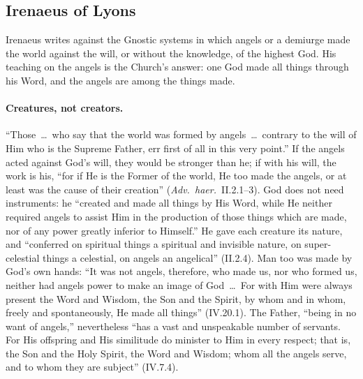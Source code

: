 \sectionguard
\subsection{Irenaeus of Lyons}

Irenaeus writes against the Gnostic systems in which angels or a
demiurge made the world against the will, or without the knowledge, of the
highest God. His teaching on the angels is the Church's answer: one God
made all things through his Word, and the angels are among the things made.

\paragraph{Creatures, not creators.} ``Those~\dots\ who say that the world
was formed by angels~\dots\ contrary to the will of Him who is the
Supreme Father, err first of all in this very point.'' If the angels acted
against God's will, they would be stronger than he; if with his will, the
work is his, ``for if He is the Former of the world, He too made the
angels, or at least was the cause of their creation'' (\emph{Adv.\ haer.}\
II.2.1--3). God does not need instruments: he ``created and made all things
by His Word, while He neither required angels to assist Him in the
production of those things which are made, nor of any power greatly
inferior to Himself.'' He gave each creature its nature, and ``conferred on
spiritual things a spiritual and invisible nature, on super-celestial
things a celestial, on angels an angelical'' (II.2.4). Man too was made by
God's own hands: ``It was not angels, therefore, who made us, nor who formed
us, neither had angels power to make an image of God~\dots\ For with Him
were always present the Word and Wisdom, the Son and the Spirit, by whom
and in whom, freely and spontaneously, He made all things'' (IV.20.1). The
Father, ``being in no want of angels,'' nevertheless ``has a vast and
unspeakable number of servants. For His offspring and His similitude do
minister to Him in every respect; that is, the Son and the Holy Spirit, the
Word and Wisdom; whom all the angels serve, and to whom they are subject''
(IV.7.4).

